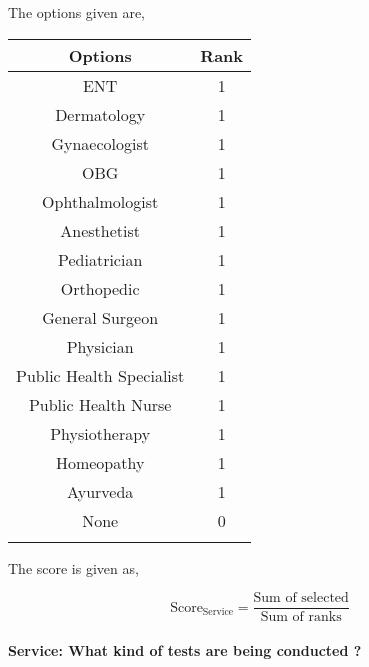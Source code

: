 \documentclass[oneside]{article}
\newcommand{\tsub}[2]{\text{#1}_{\text{#2}}}
\newcommand{\dsub}[2]{\dfrac{\text{#1}}{\text{#2}}}
\newcommand{\multsel}[1]
{
	\[
		\tsub{Score}{#1} = \dsub{Sum of selected}{Sum of ranks}
	\]
}
\newenvironment{ttable}
{
\begin{center}
\begin{tabular}{c|c}
\hline
}
{
\\ \hline
\end{tabular}
\end{center}
}
\begin{document}
The options given are,
\begin{ttable}
Options & Rank \\ \hline
ENT & 1 \\
Dermatology & 1 \\
Gynaecologist & 1 \\
OBG & 1 \\
Ophthalmologist & 1 \\
Anesthetist & 1 \\
Pediatrician & 1 \\
Orthopedic & 1 \\
General Surgeon & 1 \\
Physician & 1 \\
Public Health Specialist & 1 \\
Public Health Nurse & 1 \\
Physiotherapy & 1 \\
Homeopathy & 1 \\
Ayurveda & 1 \\
None & 0 \\
\hline
\end{ttable}
The score is given as,
\multsel{Service}
\paragraph{Service: What kind of tests are being conducted ?}
\end{document}
